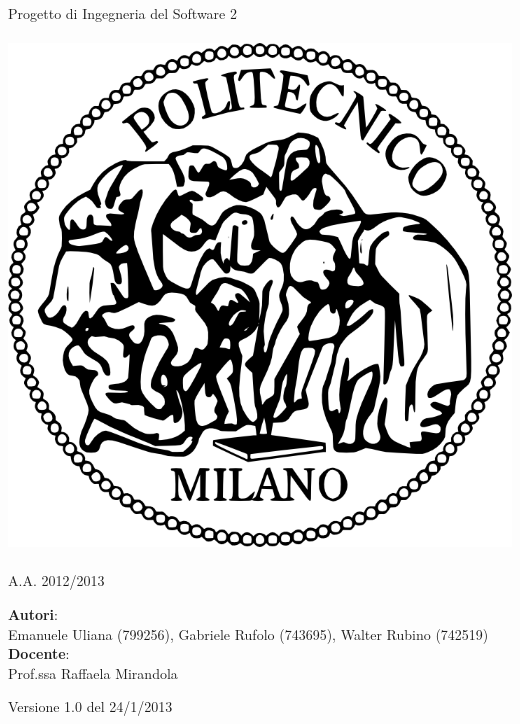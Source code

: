 \documentclass[a4paper,12pt]{article}
\begin{document}
\vspace*{\fill}
\begin{center}
{\fontsize{28}{10} \selectfont \textcolor{mygrey}{Progetto di Ingegneria del Software 2} \\[2\baselineskip]} {\fontsize{42}{10} \selectfont {\bfseries SWIMv2}} \\[4\baselineskip]
\includegraphics[scale=0.4]{polimi} \\[4\baselineskip]
{\fontsize{28}{10} \selectfont {\bfseries \textcolor{blue}{Manuale d'uso}} \\[2\baselineskip] A.A. 2012/2013}
\end{center}
\begin{flushleft}
{\fontsize{18}{10}
{\bfseries Autori}: \\ Emanuele Uliana (799256), Gabriele Rufolo (743695), Walter Rubino (742519) \\[1\baselineskip]
{\bfseries Docente}: \\ Prof.ssa Raffaela Mirandola
}
\end{flushleft}
\vspace*{\fill}
\begin{center}
Versione 1.0 del 24/1/2013 \\
\end{center}

\clearpage
\end{document}

